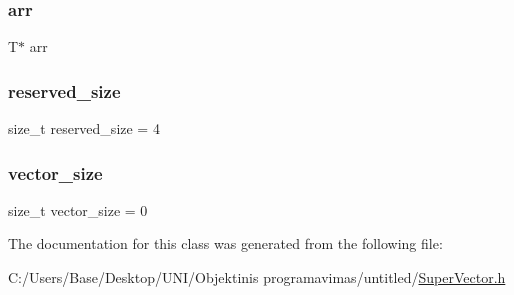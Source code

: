 \subsubsection{\texorpdfstring{arr}{arr}}
{\footnotesize\ttfamily T$\ast$ arr\hspace{0.3cm}{\ttfamily [private]}}

\mbox{\label{classvector_a743a68c874026b0316b91628e18cf2e4}} 
\subsubsection{\texorpdfstring{reserved\+\_\+size}{reserved\_size}}
{\footnotesize\ttfamily size\+\_\+t reserved\+\_\+size = 4\hspace{0.3cm}{\ttfamily [private]}}

\mbox{\label{classvector_a28e18243c88fd99888246e855cc116fd}} 
\subsubsection{\texorpdfstring{vector\+\_\+size}{vector\_size}}
{\footnotesize\ttfamily size\+\_\+t vector\+\_\+size = 0\hspace{0.3cm}{\ttfamily [private]}}



The documentation for this class was generated from the following file\+:\begin{DoxyCompactItemize}
\item 
C\+:/\+Users/\+Base/\+Desktop/\+U\+N\+I/\+Objektinis programavimas/untitled/\mbox{\hyperlink{SuperVector_8h}{Super\+Vector.\+h}}\end{DoxyCompactItemize}
